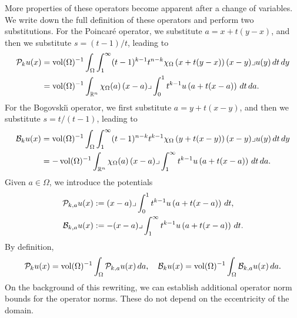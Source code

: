 \documentclass[10pt,a4paper]{article}
\begin{document}
More properties of these operators become apparent after a change of variables. 
We write down the full definition of these operators and perform two substitutions.
For the Poincar\'e operator, we substitute $a = x + t(y-x)$, and then we substitute $s = (t-1)/t$,
leading to 
\begin{align*}
    {\mathcal P}_{k} u(x) 
    &= 
    \operatorname{vol}(\Omega)^{-1}
    \int_{\Omega} \int_{1}^\infty (t-1)^{k-1}t^{n-k} 
    \chi_{\Omega}\left(x+t(y-x)\right) 
    (x-y)\lrcorner u(y) \,dt\,dy 
    \\
    &=
    \operatorname{vol}(\Omega)^{-1}
    \int_{{\mathbb R}^{n}} \chi_{\Omega}(a) \,(x-a)\lrcorner \int_{0}^{1} t^{k-1} u\left(a+t(x-a)\right)\,dt\,da
    .
\end{align*}
For the Bogovski\u{\i} operator, we first substitute $a = y + t(x-y)$, and then we substitute $s = t/(t-1)$,
leading to 
\begin{align*}
    {\mathcal B}_{k} u(x) 
    &= 
    \operatorname{vol}(\Omega)^{-1}
    \int_{\Omega} \int_{1}^\infty (t-1)^{n-k}t^{k-1} 
    \chi_{\Omega}\left(y+t(x-y)\right) 
    (x-y)\lrcorner u(y) \,dt\,dy 
    \\
    &=
    - 
    \operatorname{vol}(\Omega)^{-1}
    \int_{{\mathbb R}^{n}} \chi_{\Omega}(a) \,(x-a)\lrcorner \int_{1}^\infty t^{k-1} u\left(a+t(x-a)\right)\,dt\,da
    .
\end{align*}
% 
Given $a \in \Omega$, we introduce the potentials 
\begin{align*}
    {\mathcal P}_{k,a} u(x) 
    &:= 
    (x-a)\lrcorner \int_{0}^{1} t^{k-1} u\left(a+t(x-a)\right)\,dt
    ,
    \\
    {\mathcal B}_{k,a} u(x) 
    &:= 
    - (x-a)\lrcorner \int_{1}^\infty t^{k-1} u\left(a+t(x-a)\right)\,dt
    .
\end{align*}
By definition,
\begin{align*}
    {\mathcal P}_{k} u(x) 
    =
    \operatorname{vol}(\Omega)^{-1}
    \int_{\Omega} {\mathcal P}_{k,a} u(x) \,da,
    \quad 
    {\mathcal B}_{k} u(x) 
    =
    \operatorname{vol}(\Omega)^{-1}
    \int_{\Omega} {\mathcal B}_{k,a} u(x) \,da
    .
\end{align*}
On the background of this rewriting, we can establish additional operator norm bounds for the operator norms. 
These do not depend on the eccentricity of the domain. 
\end{document}
